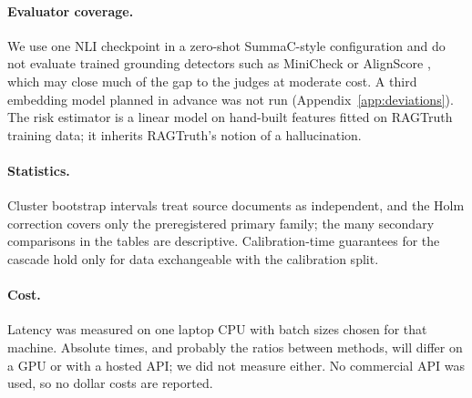 \paragraph{Evaluator coverage.} We use one NLI checkpoint in a zero-shot SummaC-style configuration and do not evaluate trained grounding detectors such as MiniCheck or AlignScore \citep{tang2024minicheck,zha2023alignscore}, which may close much of the gap to the judges at moderate cost. A third embedding model planned in advance was not run (Appendix~\ref{app:deviations}). The risk estimator is a linear model on hand-built features fitted on RAGTruth training data; it inherits RAGTruth's notion of a hallucination.

\paragraph{Statistics.} Cluster bootstrap intervals treat source documents as independent, and the Holm correction covers only the preregistered primary family; the many secondary comparisons in the tables are descriptive. Calibration-time guarantees for the cascade hold only for data exchangeable with the calibration split.

\paragraph{Cost.} Latency was measured on one laptop CPU with batch sizes chosen for that machine. Absolute times, and probably the ratios between methods, will differ on a GPU or with a hosted API; we did not measure either. No commercial API was used, so no dollar costs are reported.
